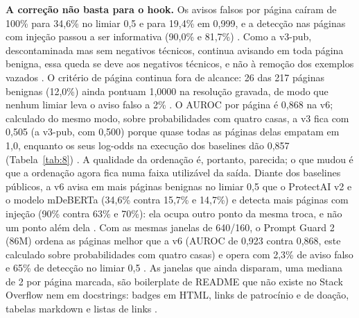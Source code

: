 \documentclass[11pt]{article}
\begin{document}
\textbf{A correção não basta para o hook.} Os avisos falsos por página caíram de 100\% para 34,6\% no limiar 0,5 e para 19,4\% em 0,999, e a detecção nas páginas com injeção passou a ser informativa (90,0\% e 81,7\%)%
. Como a v3-pub, descontaminada mas sem negativos técnicos, continua avisando em toda página benigna, essa queda se deve aos negativos técnicos, e não à remoção dos exemplos vazados%
. O critério de página continua fora de alcance: 26 das 217 páginas benignas (12,0\%) ainda pontuam 1,0000 na resolução gravada, de modo que nenhum limiar leva o aviso falso a 2\%%
. O AUROC por página é 0,868 na v6; calculado do mesmo modo, sobre probabilidades com quatro casas, a v3 fica com 0,505 (a v3-pub, com 0,500) porque quase todas as páginas delas empatam em 1,0, enquanto os seus log-odds na execução dos baselines dão 0,857 (Tabela~\ref{tab:8})%
. A qualidade da ordenação é, portanto, parecida; o que mudou é que a ordenação agora fica numa faixa utilizável da saída. Diante dos baselines públicos, a v6 avisa em mais páginas benignas no limiar 0,5 que o ProtectAI v2 e o modelo mDeBERTa (34,6\% contra 15,7\% e 14,7\%) e detecta mais páginas com injeção (90\% contra 63\% e 70\%): ela ocupa outro ponto da mesma troca, e não um ponto além dela%
. Com as mesmas janelas de 640/160, o Prompt Guard 2 (86M) ordena as páginas melhor que a v6 (AUROC de 0,923 contra 0,868, este calculado sobre probabilidades com quatro casas) e opera com 2,3\% de aviso falso e 65\% de detecção no limiar 0,5%
. As janelas que ainda disparam, uma mediana de 2 por página marcada, são boilerplate de README que não existe no Stack Overflow nem em docstrings: badges em HTML, links de patrocínio e de doação, tabelas markdown e listas de links%
.
\end{document}
